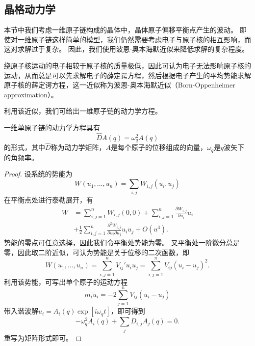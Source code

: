 \subsection{晶格动力学}
本节中我们考虑一维原子链构成的晶体中，晶体原子偏移平衡点产生的波动。
即使对一维原子链这样简单的模型，我们仍然需要考虑电子与原子核的相互影响，而这对求解过于复杂。
因此，我们使用波恩-奥本海默近似来降低求解的复杂程度。
\begin{theorem}
    绕原子核运动的电子相较于原子核的质量极低，因此可认为电子无法影响原子核的运动，从而总是可以先求解电子的薛定谔方程，然后根据电子产生的平均势能求解原子核的薛定谔方程，这一近似称为波恩-奥本海默近似（Born-Oppenheimer approximation）。
\end{theorem}

利用该近似，我们可给出一维原子链的动力学方程。
\begin{proposition}
    一维单原子链的动力学方程具有
    \begin{equation}
        \hat D A(q) = \omega_q^2 A(q)
    \end{equation}
    的形式，其中$\hat D$称为动力学矩阵，$A$是每个原子的位移组成的向量，$\omega_q$是$q$波矢下的角频率。
\end{proposition}

\begin{proof}
    设系统的势能为
    \begin{equation}
        W(u_1, \dots, u_n) = \sum_{i,j} W_{i,j} (u_i, u_j)
    \end{equation}
    在平衡点处进行泰勒展开，有
    \begin{equation}
        \begin{aligned}
            W &= \sum_{i,j=1}^n W_{i,j}(0,0) + \sum_{i,j=1}^n \frac{\partial W_{i,j}}{\partial u_i} u_i \\
            &+ \frac{1}{2} \sum_{i,j=1}^n \frac{\partial^2 W_{i,j}}{\partial u_i \partial u_j} u_i u_j + O(u^3).
        \end{aligned}
    \end{equation}
    势能的零点可任意选择，因此我们令平衡处势能为零。
    又平衡处一阶微分总是零，因此取二阶近似，可认为势能是关于位移的二次函数，即
    \begin{equation}
        W(u_1, \dots, u_n) = \sum_{i,j=1}^n V_{ij}' u_i u_j  = \sum_{i,j=1}^n V_{ij} (u_i - u_j)^2.
    \end{equation}
    利用该势能，可写出单个原子的运动方程
    \begin{equation}
        m_i \ddot u_i = - 2 \sum_{j=1}^n V_{ij}(u_i - u_j)
    \end{equation}
    带入谐波解$u_i = A_i(q) \exp[i \omega_q t]$，即可得到
    \begin{equation}
        - \omega_q^2 A_i(q) + \sum_j D_{i,j} A_j(q) = 0.
    \end{equation}
    重写为矩阵形式即可。
\end{proof}

